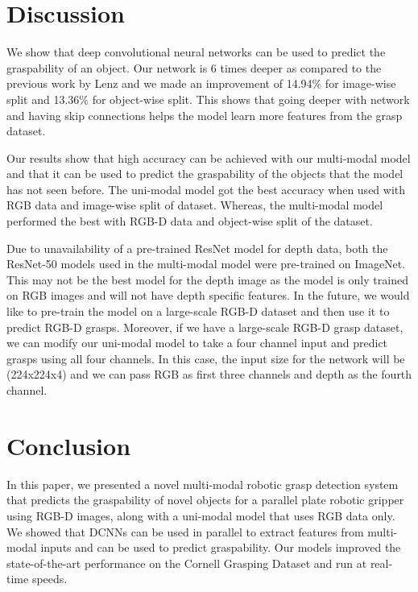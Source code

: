 \documentclass[10pt,twocolumn,letterpaper]{article}
\begin{document}
\section{Discussion}
We show that deep convolutional neural networks can be used to predict the graspability of an object. Our network is 6 times deeper as compared to the previous work by Lenz \etal and we made an improvement of 14.94\% for image-wise split and 13.36\% for object-wise split. This shows that going deeper with network and having skip connections helps the model learn more features from the grasp dataset.

Our results show that high accuracy can be achieved with our multi-modal model and that it can be used to predict the graspability of the objects that the model has not seen before. The uni-modal model got the best accuracy when used with RGB data and image-wise split of dataset. Whereas, the multi-modal model performed the best with RGB-D data and object-wise split of the dataset.

Due to unavailability of a pre-trained ResNet model for depth data, both the ResNet-50 models used in the multi-modal model were pre-trained on ImageNet. This may not be the best model for the depth image as the model is only trained on RGB images and will not have depth specific features. In the future, we would like to pre-train the model on a large-scale RGB-D dataset and then use it to predict RGB-D grasps. Moreover, if we have a large-scale RGB-D grasp dataset, we can modify our uni-modal model to take a four channel input and predict grasps using all four channels. In this case, the input size for the network will be (224x224x4) and we can pass RGB as first three channels and depth as the fourth channel.



\section{Conclusion}
In this paper, we presented a novel multi-modal robotic grasp detection system that predicts the graspability of novel objects for a parallel plate robotic gripper using RGB-D images, along with a uni-modal model that uses RGB data only. We showed that DCNNs can be used in parallel to extract features from multi-modal inputs and can be used to predict graspability. Our models improved the state-of-the-art performance on the Cornell Grasping Dataset and run at real-time speeds.





{\small


}
\end{document}
